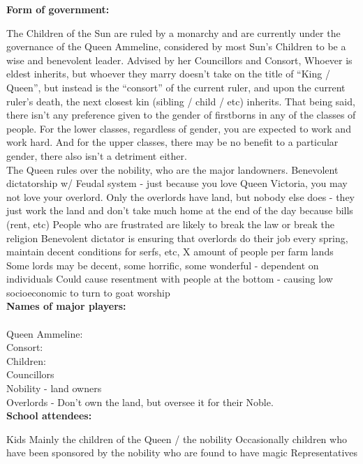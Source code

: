\documentclass[blue]{GL2020}
\begin{document}
\name{\bTest{}}

\textbf{Form of government:}

The Children of the Sun are ruled by a monarchy and are currently under the governance of the Queen Ammeline, considered by most Sun's Children to be a wise and benevolent leader.  Advised by her Councillors and Consort, Whoever is eldest inherits, but whoever they marry doesn't take on the title of "`King / Queen"', but instead is the "`consort"' of the current ruler, and upon the current ruler's death, the next closest kin (sibling / child / etc) inherits.  That being said, there isn't any preference given to the gender of firstborns in any of the classes of people.  For the lower classes, regardless of gender, you are expected to work and work hard.  And for the upper classes, there may be no benefit to a particular gender, there also isn't a detriment either.\\

The Queen rules over the nobility, who are the major landowners. Benevolent dictatorship w/ Feudal system - just because you love Queen Victoria, you may not love your overlord.  Only the overlords have land, but nobody else does - they just work the land and don’t take much home at the end of the day because bills (rent, etc)
People who are frustrated are likely to break the law or break the religion
Benevolent dictator is ensuring that overlords do their job every spring, maintain decent conditions for serfs, etc, X amount of people per farm lands
Some lords may be decent, some horrific, some wonderful - dependent on individuals
Could cause resentment with people at the bottom - causing low socioeconomic to turn to goat worship\\
 

\textbf{Names of major players:}
\\
\\Queen Ammeline:\\
Consort:\\
Children:\\
Councillors\\
Nobility - land owners\\
Overlords - Don't own the land, but oversee it for their Noble.\\

\textbf{School attendees:}

Kids
Mainly the children of the Queen / the nobility
Occasionally children who have been sponsored by the nobility who are found to have magic
Representatives
\end{document}
